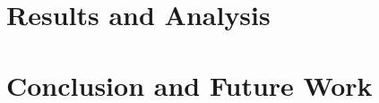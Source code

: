 \documentclass[conference]{IEEEtran}
\begin{document}
\section{Results and Analysis}


\section{Conclusion and Future Work}




\end{document}
